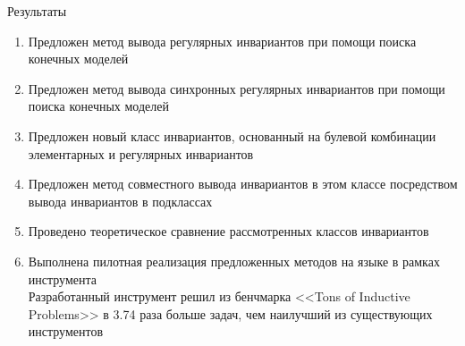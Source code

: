 \begin{frame}{Результаты}
\begin{enumerate}
\item Предложен метод вывода регулярных инвариантов при помощи поиска конечных моделей
\item Предложен метод вывода синхронных регулярных инвариантов при помощи поиска конечных моделей
\item Предложен новый класс инвариантов, основанный на булевой комбинации элементарных и регулярных инвариантов
\item Предложен метод совместного вывода инвариантов в этом классе посредством вывода инвариантов в подклассах
\item Проведено теоретическое сравнение рассмотренных классов инвариантов
\item Выполнена пилотная реализация предложенных методов на языке \fsharp{} в рамках инструмента \theringen{}\\Разработанный инструмент решил из бенчмарка <<Tons of Inductive Problems>> в 3.74 раза больше задач, чем наилучший из существующих инструментов
\end{enumerate}
\end{frame}